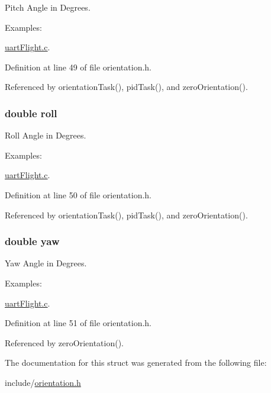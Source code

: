 Pitch Angle in Degrees. 

\begin{Desc}
\item[Examples\-: ]\par
\hyperlink{uart_flight_8c-example}{uart\-Flight.\-c}.\end{Desc}


Definition at line 49 of file orientation.\-h.



Referenced by orientation\-Task(), pid\-Task(), and zero\-Orientation().

\hypertarget{struct_angles_a1d3228afa3a1d6773954f40c1e519eb9}{
\subsubsection[{roll}]{\setlength{\rightskip}{0pt plus 5cm}double roll}}\label{struct_angles_a1d3228afa3a1d6773954f40c1e519eb9}


Roll Angle in Degrees. 

\begin{Desc}
\item[Examples\-: ]\par
\hyperlink{uart_flight_8c-example}{uart\-Flight.\-c}.\end{Desc}


Definition at line 50 of file orientation.\-h.



Referenced by orientation\-Task(), pid\-Task(), and zero\-Orientation().

\hypertarget{struct_angles_a21cd490f6191f66678f55b4c242a10cf}{
\subsubsection[{yaw}]{\setlength{\rightskip}{0pt plus 5cm}double yaw}}\label{struct_angles_a21cd490f6191f66678f55b4c242a10cf}


Yaw Angle in Degrees. 

\begin{Desc}
\item[Examples\-: ]\par
\hyperlink{uart_flight_8c-example}{uart\-Flight.\-c}.\end{Desc}


Definition at line 51 of file orientation.\-h.



Referenced by zero\-Orientation().



The documentation for this struct was generated from the following file\-:\begin{DoxyCompactItemize}
\item 
include/\hyperlink{orientation_8h}{orientation.\-h}\end{DoxyCompactItemize}
